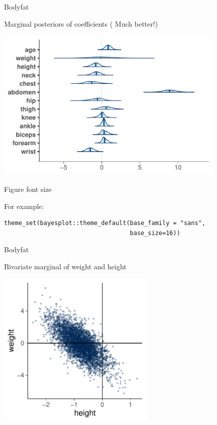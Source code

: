 \documentclass[english,t]{beamer}
\begin{document}
\begin{frame}
  
  {\Large\color{navyblue} Bodyfat}

  Marginal posteriors of coefficients ({\color{red} Much better!})
  
  \includegraphics[width=11cm]{bodyfat_mcmc_areas.pdf}

\end{frame}

\begin{frame}[fragile]
  
  {\Large\color{navyblue} Figure font size}

For example:
  
\begin{verbatim}
theme_set(bayesplot::theme_default(base_family = "sans",
                                   base_size=16))
\end{verbatim}

\end{frame}


\begin{frame}
  
  {\Large\color{navyblue} Bodyfat}

  Bivariate marginal of weight and height
  
  \includegraphics[width=7.5cm]{bodyfat_mcmc_scatter.pdf}

\end{frame}
\end{document}
